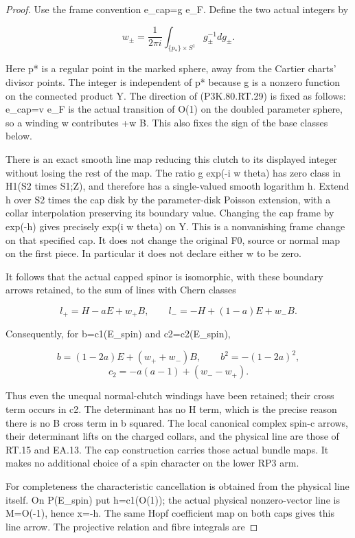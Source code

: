 \begin{proof}
Use the frame convention e\_cap=g e\_F. Define the two actual
integers by

\[
 w_\pm=\frac{1}{2\pi i}\int_{\{p_*\}\times S^1}
                              g_\pm^{-1}dg_\pm .   \tag{P3K.80.RT.29}
\]

Here p* is a regular point in the marked sphere, away from the
Cartier charts' divisor points. The integer is independent of p*
because g is a nonzero function on the connected product Y.
The direction of (P3K.80.RT.29) is fixed as follows: e\_cap=v e\_F is
the actual transition of O(1) on the doubled parameter sphere,
so a winding w contributes +w B. This also fixes the sign of
the base classes below.

There is an exact smooth line map reducing this clutch to its
displayed integer without losing the rest of the map. The ratio
g exp(-i w theta) has zero class in H1(S2 times S1;Z), and
therefore has a single-valued smooth logarithm h. Extend h over
S2 times the cap disk by the parameter-disk Poisson extension,
with a collar interpolation preserving its boundary value. Changing
the cap frame by exp(-h) gives precisely exp(i w theta) on Y.
This is a nonvanishing frame change on that specified cap. It
does not change the original F0, source or normal map on the first
piece. In particular it does not declare either w to be zero.

It follows that the actual capped spinor is isomorphic, with these
boundary arrows retained, to the sum of lines with Chern classes

\[
 l_+=H-aE+w_+B,\qquad
 l_-=-H+(1-a)E+w_-B.                               \tag{P3K.80.RT.30}
\]

Consequently, for b=c1(E\_spin) and c2=c2(E\_spin),

\[
 b=(1-2a)E+(w_++w_-)B,\qquad b^2=-(1-2a)^2,
\]
\[
 c_2=-a(a-1)+(w_--w_+).                            \tag{P3K.80.RT.31}
\]

Thus even the unequal normal-clutch windings have been retained;
their cross term occurs in c2. The determinant has no H term,
which is the precise reason there is no B cross term in b squared.
The local canonical complex spin-c arrows, their determinant
lifts on the charged collars, and the physical line are those
of RT.15 and EA.13. The cap construction carries those actual
bundle maps. It makes no additional choice of a spin character
on the lower RP3 arm.

For completeness the characteristic cancellation is obtained from
the physical line itself. On P(E\_spin) put h=c1(O(1)); the actual
physical nonzero-vector line is M=O(-1), hence x=-h. The same
Hopf coefficient map on both caps gives this line arrow. The
projective relation and fibre integrals are


\end{proof}
